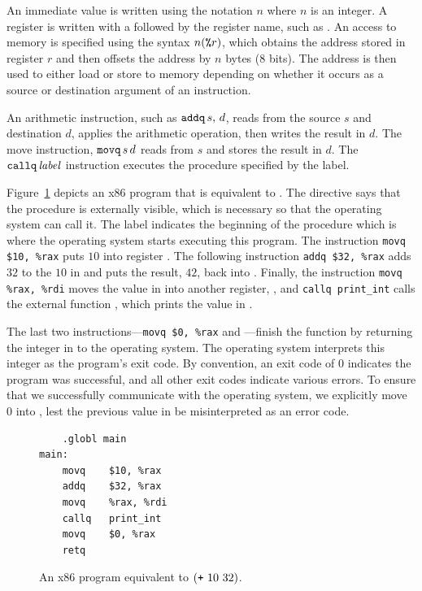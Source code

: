 \documentclass[11pt]{book}
\newcommand{\margincomment}[1]{\marginpar{#1}}
\newcommand{\margincomment}[1]{}
\begin{document}
An immediate value is written using the notation \key{\$}$n$ where $n$
is an integer.
%
A register is written with a \key{\%} followed by the register name,
such as .
%
An access to memory is specified using the syntax $n(\texttt{\%}r)$,
which obtains the address stored in register $r$ and then
offsets the address by $n$ bytes
(8 bits). The address is then used to either load or store to memory
depending on whether it occurs as a source or destination argument of
an instruction.

An arithmetic instruction, such as $\texttt{addq}\,s,\,d$, reads from the
source $s$ and destination $d$, applies the arithmetic operation, then
writes the result in $d$.
%
The move instruction, $\texttt{movq}\,s\,d$ reads from $s$ and stores the
result in $d$.
%
The $\texttt{callq}\,\mathit{label}$ instruction executes the procedure
specified by the label.

Figure~\ref{fig:p0-x86} depicts an x86 program that is equivalent
to . The  directive says that the
 procedure is externally visible, which is necessary so
that the operating system can call it. The label 
indicates the beginning of the  procedure which is where
the operating system starts executing this program.  The instruction
\lstinline{movq $10, %rax} puts $10$ into register . The
following instruction \lstinline{addq $32, %rax} adds $32$ to the
$10$ in  and puts the result, $42$, back into
. Finally, the instruction \lstinline{movq %rax, %rdi} moves the value
in  into another register, , and
\lstinline{callq print_int} calls the external function , which
prints the value in .

The last two instructions---\lstinline{movq $0, %rax} and ---finish
the  function by returning the integer in  to the
operating system. The operating system interprets this integer as the program's
exit code. By convention, an exit code of 0 indicates the program was
successful, and all other exit codes indicate various errors. To ensure that
we successfully communicate with the operating system, we explicitly move 0
into , lest the previous value in  be misinterpreted as an
error code.


\begin{figure}[tbp]
\begin{lstlisting}
	.globl main
main:
	movq	$10, %rax
	addq	$32, %rax
	movq	%rax, %rdi
	callq	print_int
	movq    $0, %rax
	retq
\end{lstlisting}
\caption{An x86 program equivalent to $(\texttt{+}~10~32)$.}
\label{fig:p0-x86}
\end{figure}
\end{document}
